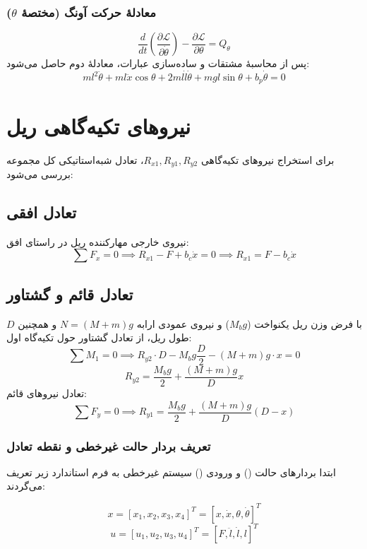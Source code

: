 \subsubsection{معادلهٔ حرکت آونگ (مختصهٔ $\theta$)}
\[
    \frac{d}{dt}\left(\frac{\partial \mathcal{L}}{\partial \dot{\theta}}\right) - \frac{\partial \mathcal{L}}{\partial \theta} = Q_\theta
\]
پس از محاسبهٔ مشتقات و ساده‌سازی عبارات، معادلهٔ دوم حاصل می‌شود:
\[
    ml^2\ddot{\theta} + ml\ddot{x}\cos\theta + 2ml\dot{l}\dot{\theta} + mgl\sin\theta + b_p\dot{\theta} = 0
\]
\section{نیروهای تکیه‌گاهی ریل}

برای استخراج نیروهای تکیه‌گاهی $R_{x1}, R_{y1}, R_{y2}$، تعادل شبه‌استاتیکی کل مجموعه بررسی می‌شود:

\subsection{تعادل افقی}
نیروی خارجی مهارکننده ریل در راستای افق:
\[
    \sum F_x = 0 \implies R_{x1} - F + b_c\dot{x} = 0 \implies R_{x1} = F - b_c\dot{x}
\]

\subsection{تعادل قائم و گشتاور}
با فرض وزن ریل یکنواخت ($M_b g$) و نیروی عمودی ارابه $N = (M+m)g$ و همچنین $D$ طول ریل، از تعادل گشتاور حول تکیه‌گاه اول:
\[
    \sum M_1 = 0 \implies R_{y2} \cdot D - M_b g \frac{D}{2} - (M+m)g \cdot x = 0
\]
\[
    R_{y2} = \frac{M_b g}{2} + \frac{(M+m)g}{D} x
\]
تعادل نیروهای قائم:
\[
    \sum F_y = 0 \implies R_{y1} = \frac{M_b g}{2} + \frac{(M+m)g}{D} (D-x)
\]

\subsubsection{تعریف بردار حالت غیرخطی و نقطه تعادل}

ابتدا بردارهای حالت () و ورودی () سیستم غیرخطی به فرم استاندارد زیر تعریف می‌گردند:

\begin{equation}
    x = [x_1, x_2, x_3, x_4]^T = [x, \dot{x}, \theta, \dot{\theta}]^T
\end{equation}
\begin{equation}
    u = [u_1, u_2, u_3, u_4]^T = [F, \ddot{l}, \dot{l}, l]^T
\end{equation}

